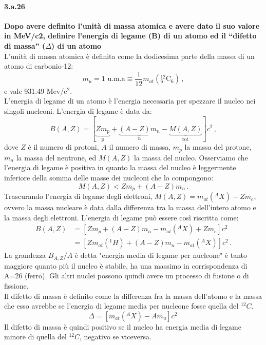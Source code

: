 \documentclass[twoside]{article}
\begin{document}
\paragraph{3.a.26}\textbf{Dopo avere definito l’unità di massa atomica e avere dato il suo valore in MeV/c2, definire l’energia di legame (B) di un atomo ed il “difetto di massa” ($\Delta$) di un atomo}\\
L'unità di massa atomica è definita come la dodicesima parte della massa di un atomo di carbonio-12:
\begin{equation}
m_u=\text{1 u.m.a}\equiv \frac{1}{12}m_{at}({}_{6}^{12}\text{C}_6) \, ,
\end{equation}
e vale 931.49 Mev/c$^2$.\\
L'energia di legame di un atomo è l'energia necessaria per spezzare il nucleo nei singoli nucleoni. L'energia di legame è data da:
\begin{equation}
B(A,Z)=[\underbrace{Zm_p}_\text{p} + \underbrace{(A-Z)m_n}_\text{n} -\underbrace{M(A,Z)}_\text{tot}]c^2 \, ,
\end{equation}
dove $Z$ è il numero di protoni, $A$ il numero di massa, $m_p$ la massa del protone, $m_n$ la massa del neutrone, ed $M(A,Z)$ la massa del nucleo. Osserviamo che l'energia di legame è positiva in quanto la massa del nucleo è leggermente inferiore della somma delle masse dei nucleoni che lo compongono:
\begin{equation}
M(A,Z)<Zm_p+(A-Z)m_n \, .
\end{equation}
Trascurando l'energia di legame degli elettroni, $M(A,Z)=m_{at}({}^AX)-Zm_e$, ovvero la massa nucleare è data dalla differenza tra la massa dell'intero atomo e la massa degli elettroni. L'energia di legame può essere così riscritta come:
\begin{align}
B(A,Z)&=[Zm_p + (A-Z)m_n -m_{at}({}^AX)+Zm_e]c^2 \nonumber \\
&=[Zm_{at}({}^1H)+(A-Z)m_n -m_{at}({}^AX)]c^2 \, .
\end{align}
La grandezza $B_{A,Z}/A$ è detta "energia media di legame per nucleone" è tanto maggiore quanto più il nucleo è stabile, ha una massimo in corrispondenza di A=26 (ferro). Gli altri nuclei possono quindi avere un processo di fusione o di fissione.\\
Il difetto di massa è definito come la differenza fra la massa dell'atomo e la massa che esso avrebbe se l'energia di legame media per nucleone fosse quella del ${}^{12}C$.
\begin{equation}
\Delta=[m_{at}({}^AX)-Am_u]c^2 \, 
\end{equation}
Il difetto di massa è quindi positivo se il nucleo ha energia media di legame minore di quella del ${}^{12}C$, negativo se viceversa.
\end{document}
